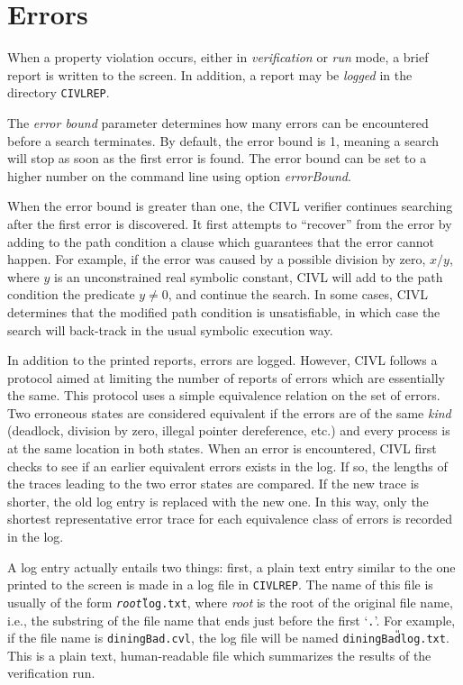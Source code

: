 \section{Errors}
\label{sec:errors}

When a property violation occurs, either in \emph{verification} or
\emph{run} mode, a brief report is written to the screen.  In
addition, a report may be \emph{logged} in the directory
\texttt{CIVLREP}.

The \emph{error bound} parameter determines how many errors can be
encountered before a search terminates.  By default, the error bound
is 1, meaning a search will stop as soon as the first error is found.
The error bound can be set to a higher number on the command line
using option \emph{errorBound}.

When the error bound is greater than one, the CIVL verifier continues
searching after the first error is discovered.  It first attempts to
``recover'' from the error by adding to the path condition a clause
which guarantees that the error cannot happen.  For example, if the
error was caused by a possible division by zero, $x/y$, where $y$ is
an unconstrained real symbolic constant, CIVL will add to the path
condition the predicate $y\neq 0$, and continue the search.  In some
cases, CIVL determines that the modified path condition is
unsatisfiable, in which case the search will back-track in the usual
symbolic execution way.

In addition to the printed reports, errors are logged.  However, CIVL
follows a protocol aimed at limiting the number of reports of errors
which are essentially the same.  This protocol uses a simple
equivalence relation on the set of errors.  Two erroneous states are
considered equivalent if the errors are of the same \emph{kind}
(deadlock, division by zero, illegal pointer dereference, etc.) and
every process is at the same location in both states.  When an error
is encountered, CIVL first checks to see if an earlier equivalent
errors exists in the log.  If so, the lengths of the traces leading to
the two error states are compared.  If the new trace is shorter, the
old log entry is replaced with the new one.  In this way, only the
shortest representative error trace for each equivalence class of
errors is recorded in the log.

A log entry actually entails two things: first, a plain text entry
similar to the one printed to the screen is made in a log file in
\texttt{CIVLREP}.  The name of this file is usually of the form
\texttt{\textit{root}{\U}log.txt}, where \textit{root} is the root of
the original file name, i.e., the substring of the file name that ends
just before the first `\texttt{.}'.  For example, if the file name is
\texttt{diningBad.cvl}, the log file will be named
\texttt{diningBad{\U}log.txt}.  This is a plain text, human-readable
file which summarizes the results of the verification run.

